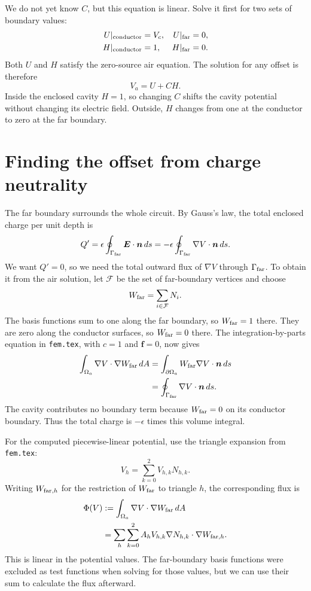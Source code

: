 \documentclass[11pt]{article}
\begin{document}
We do not yet know $C$, but this equation is linear. Solve it first
for two sets of boundary values:
\begin{align}
 U|_{\rm conductor}&=V_c,& U|_{\rm far}&=0,\\
 H|_{\rm conductor}&=1,& H|_{\rm far}&=0.
\end{align}
Both $U$ and $H$ satisfy the zero-source air equation. The solution
for any offset is therefore
\begin{equation}
 V_a=U+CH.
 \label{eq:combination}
\end{equation}
Inside the enclosed cavity $H=1$, so changing $C$ shifts the cavity
potential without changing its electric field. Outside, $H$ changes
from one at the conductor to zero at the far boundary.

\section{Finding the offset from charge neutrality}
The far boundary surrounds the whole circuit. By Gauss's law, the
total enclosed charge per unit depth is
\begin{equation}
 Q'=\epsilon\oint_{\Gamma_{\rm far}}\bm E\cdot\bm n\,ds
   =-\epsilon\oint_{\Gamma_{\rm far}}\nabla V\cdot\bm n\,ds.
\end{equation}
We want $Q'=0$, so we need the total outward flux of $\nabla V$
through $\Gamma_{\rm far}$. To obtain it from the air solution,
let $\mathcal F$ be the set of far-boundary vertices and choose
\begin{equation}
 W_{\rm far}=\sum_{i\in\mathcal F}N_i.
\end{equation}
The basis functions sum to one along the far boundary, so
$W_{\rm far}=1$ there. They are zero along the conductor surfaces,
so $W_{\rm far}=0$ there. The integration-by-parts equation in
\texttt{fem.tex}, with $c=1$ and $\bm f=0$, now gives
\begin{align}
 \int_{\Omega_a}\nabla V\cdot\nabla W_{\rm far}\,dA
 &=\int_{\partial\Omega_a}W_{\rm far}\nabla V\cdot\bm n\,ds\\
 &=\oint_{\Gamma_{\rm far}}\nabla V\cdot\bm n\,ds.
\end{align}
The cavity contributes no boundary term because $W_{\rm far}=0$
on its conductor boundary. Thus the total charge is $-\epsilon$
times this volume integral.

For the computed piecewise-linear potential, use the triangle
expansion from \texttt{fem.tex}:
\begin{equation}
 V_h=\sum_{k=0}^2V_{h,k}N_{h,k}.
\end{equation}
Writing $W_{{\rm far},h}$ for the restriction of $W_{\rm far}$
to triangle $h$, the corresponding flux is
\begin{align}
 \Phi(V)
 &:=\int_{\Omega_a}\nabla V\cdot\nabla W_{\rm far}\,dA\\
 &=\sum_h\sum_{k=0}^2
   A_hV_{h,k}\nabla N_{h,k}\cdot\nabla W_{{\rm far},h}.
 \label{eq:reaction}
\end{align}
This is linear in the potential values. The far-boundary
basis functions were excluded as test functions when solving for
those values, but we can use their sum to calculate the flux afterward.
\end{document}

